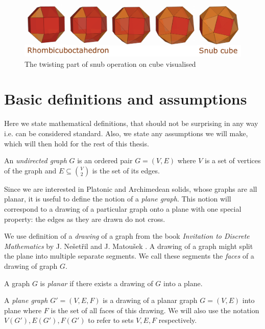 \begin{description}
\begin{figure}[H]
    \centering
    \includegraphics[width=1\textwidth]{Resources/Figs/op_snub_pdfa.pdf}
    \caption{The twisting part of snub operation on cube visualised \cite{natal-polyhed-viewer}}
    \label{fig:op_snub}
\end{figure}
    
\end{description}

\section{Basic definitions and assumptions}

Here we state mathematical definitions, that should not be surprising in any way i.e. can be considered standard. Also, we state any assumptions we will make, which will then hold for the rest of this thesis.

\begin{defn}
    An \emph{undirected graph} $G$ is an ordered pair $G=(V,E)$ where $V$ is a set of vertices of the graph and $E \subseteq \binom{V}{2}$ is the set of its edges. 
\end{defn}

Since we are interested in Platonic and Archimedean solids, whose graphs are all planar, it is useful to define the notion of a \textit{plane graph}. This notion will correspond to a drawing of a particular graph onto a plane with one special property: the edges as they are drawn do not cross. 

We use definition of a \textit{drawing} of a graph from the book \textit{Invitation to Discrete Mathematics} by J. Nešetřil and J. Matoušek \cite{matousek2009}. A drawing of a graph might split the plane into multiple separate segments. We call these segments the \textit{faces} of a drawing of graph $G$.

\begin{defn}
    A graph $G$ is \emph{planar} if there exists a drawing of $G$ into a plane.
\end{defn}

\begin{defn}
    A \emph{plane graph} $G' = (V,E,F)$ is a drawing of a planar graph $G=(V,E)$ into plane where $F$ is the set of all faces of this drawing. We will also use the notation $V(G'), E(G'), F(G')$ to refer to sets $V,E,F$ respectively.
\end{defn}

